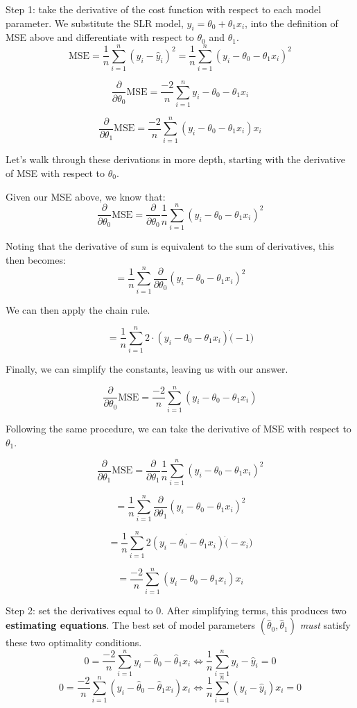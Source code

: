 \documentclass[
  letterpaper,
  DIV=11,
  numbers=noendperiod]{scrreprt}
\begin{document}
Step 1: take the derivative of the cost function with respect to each
model parameter. We substitute the SLR model,
\(\hat{y}_i = \theta_0+\theta_1 x_i\), into the definition of MSE above
and differentiate with respect to \(\theta_0\) and \(\theta_1\).
\[\text{MSE} = \frac{1}{n} \sum_{i=1}^{n} (y_i - \hat{y}_i)^2 = \frac{1}{n} \sum_{i=1}^{n} (y_i - \theta_0 - \theta_1 x_i)^2\]

\[\frac{\partial}{\partial \theta_0} \text{MSE} = \frac{-2}{n} \sum_{i=1}^{n} y_i - \theta_0 - \theta_1 x_i\]

\[\frac{\partial}{\partial \theta_1} \text{MSE} = \frac{-2}{n} \sum_{i=1}^{n} (y_i - \theta_0 - \theta_1 x_i)x_i\]

Let's walk through these derivations in more depth, starting with the
derivative of MSE with respect to \(\theta_0\).

Given our MSE above, we know that:
\[\frac{\partial}{\partial \theta_0} \text{MSE} = \frac{\partial}{\partial \theta_0} \frac{1}{n} \sum_{i=1}^{n} {(y_i - \theta_0 - \theta_1 x_i)}^{2}\]

Noting that the derivative of sum is equivalent to the sum of
derivatives, this then becomes:
\[ = \frac{1}{n} \sum_{i=1}^{n} \frac{\partial}{\partial \theta_0} {(y_i - \theta_0 - \theta_1 x_i)}^{2}\]

We can then apply the chain rule.

\[ = \frac{1}{n} \sum_{i=1}^{n} 2 \cdot{(y_i - \theta_0 - \theta_1 x_i)}\dot(-1)\]

Finally, we can simplify the constants, leaving us with our answer.

\[\frac{\partial}{\partial \theta_0} \text{MSE} = \frac{-2}{n} \sum_{i=1}^{n}{(y_i - \theta_0 - \theta_1 x_i)}\]

Following the same procedure, we can take the derivative of MSE with
respect to \(\theta_1\).

\[\frac{\partial}{\partial \theta_1} \text{MSE} = \frac{\partial}{\partial \theta_1} \frac{1}{n} \sum_{i=1}^{n} {(y_i - \theta_0 - \theta_1 x_i)}^{2}\]

\[ = \frac{1}{n} \sum_{i=1}^{n} \frac{\partial}{\partial \theta_1} {(y_i - \theta_0 - \theta_1 x_i)}^{2}\]

\[ = \frac{1}{n} \sum_{i=1}^{n} 2 \dot{(y_i - \theta_0 - \theta_1 x_i)}\dot(-x_i)\]

\[= \frac{-2}{n} \sum_{i=1}^{n} {(y_i - \theta_0 - \theta_1 x_i)}x_i\]

Step 2: set the derivatives equal to 0. After simplifying terms, this
produces two \textbf{estimating equations}. The best set of model
parameters \((\hat{\theta}_0, \hat{\theta}_1)\) \emph{must} satisfy
these two optimality conditions.
\[0 = \frac{-2}{n} \sum_{i=1}^{n} y_i - \hat{\theta}_0 - \hat{\theta}_1 x_i \Longleftrightarrow \frac{1}{n}\sum_{i=1}^{n} y_i - \hat{y}_i = 0\]
\[0 = \frac{-2}{n} \sum_{i=1}^{n} (y_i - \hat{\theta}_0 - \hat{\theta}_1 x_i)x_i \Longleftrightarrow \frac{1}{n}\sum_{i=1}^{n} (y_i - \hat{y}_i)x_i = 0\]
\end{document}
